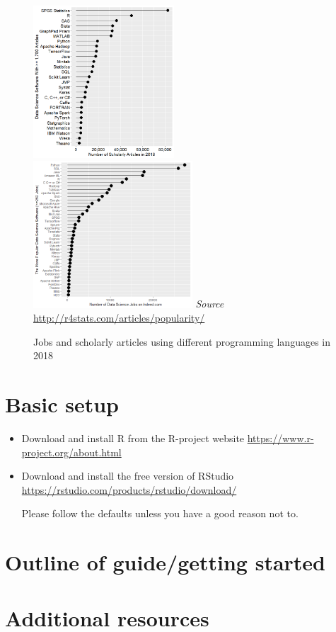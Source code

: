 \documentclass{article}
\newcommand{\fignote}[1]{{\small{#1}}}
\begin{document}
\begin{figure}
  \caption{Jobs and scholarly articles using different programming
    languages in 2018}
  \includegraphics[width =  0.47\textwidth]{pictures/number_of_scholarly_articles}%
  \includegraphics[width =
  0.53\textwidth]{pictures/number_of_data_science_jobs}
  \smallskip
  \fignote{\emph{Source} \url{http://r4stats.com/articles/popularity/}}

\end{figure}


\section{Basic setup}
\begin{itemize}
\item Download and install R from the R-project website
  \url{https://www.r-project.org/about.html}


  \item Download and install the free version of RStudio
    \url{https://rstudio.com/products/rstudio/download/}

      Please follow the defaults unless you have a good reason not to.
\end{itemize}

\section{Outline of guide/getting started}

\section{Additional resources}
\end{document}
